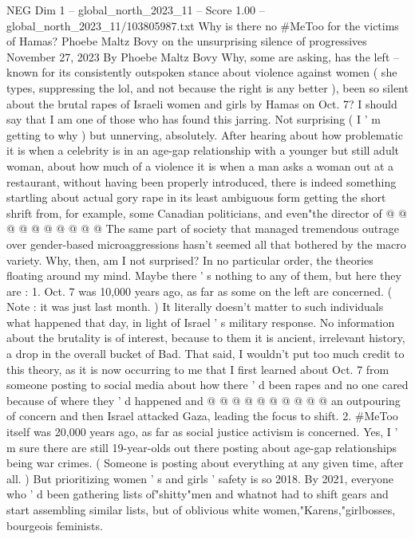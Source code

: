\begin{textsample}{NEG Dim 1 – global\_north\_2023\_11 – Score 1.00 – global\_north\_2023\_11/103805987.txt}  \label{ex:f1_neg_190}
Why is there no \#MeToo for the victims of Hamas?
Phoebe Maltz Bovy on the unsurprising silence of progressives November 27, 2023 By Phoebe Maltz Bovy Why, some are asking, has the left -- known for its consistently outspoken stance about violence against women ( she types, suppressing the lol, and not because the right is any better ), been so silent about the brutal rapes of Israeli women and girls by Hamas on Oct. 7?
I should say that I am one of those who has found this jarring.
Not surprising ( I ' m getting to why ) but unnerving, absolutely.
After hearing about how problematic it is when a celebrity is in an age-gap relationship with a younger but still adult woman, about how much of a violence it is when a man asks a woman out at a restaurant, without having been properly introduced, there is indeed something startling about actual gory rape in its least ambiguous form getting the short shrift from, for example, some Canadian politicians, and even"the director of @ @ @ @ @ @ @ @ @ @ The same part of society that managed tremendous outrage over gender-based microaggressions hasn't seemed all that bothered by the macro variety.
Why, then, am I not surprised?
In no particular order, the theories floating around my mind.
Maybe there ' s nothing to any of them, but here they are : 1.
Oct. 7 was 10,000 years ago, as far as some on the left are concerned. ( Note : it was just last month. ) It literally doesn't matter to such individuals what happened that day, in light of Israel ' s military response.
No information about the brutality is of interest, because to them it is ancient, irrelevant history, a drop in the overall bucket of Bad.
That said, I wouldn't put too much credit to this theory, as it is now occurring to me that I first learned about Oct. 7 from someone posting to social media about how there ' d been rapes and no one cared because of where they ' d happened and @ @ @ @ @ @ @ @ @ @ an outpouring of concern and then Israel attacked Gaza, leading the focus to shift. 2. \#MeToo itself was 20,000 years ago, as far as social justice activism is concerned.
Yes, I ' m sure there are still 19-year-olds out there posting about age-gap relationships being war crimes. ( Someone is posting about everything at any given time, after all. ) But prioritizing women ' s and girls ' safety is so 2018.
By 2021, everyone who ' d been gathering lists of"shitty"men and whatnot had to shift gears and start assembling similar lists, but of oblivious white women,"Karens,"girlbosses, bourgeois feminists.

\end{textsample}
